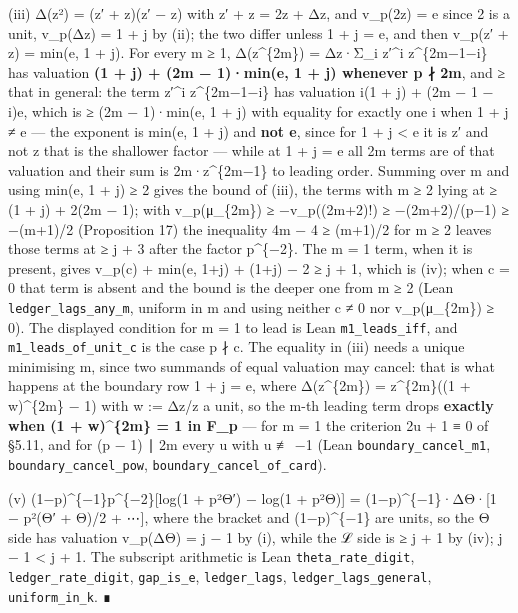 \documentclass[11pt,a4paper]{article}
\theoremstyle{named}
\begin{document}
(iii) Δ(z²) = (z′ + z)(z′ − z) with z′ + z = 2z + Δz, and v\_p(2z) = e since 2 is a unit, v\_p(Δz) = 1 + j by (ii); the two differ unless 1 + j = e, and then v\_p(z′ + z) = min(e, 1 + j). For every m ≥ 1, Δ(z\textasciicircum{}\{2m\}) = Δz·Σ\_i z′\textasciicircum{}i z\textasciicircum{}\{2m−1−i\} has valuation \textbf{(1 + j) + (2m − 1)·min(e, 1 + j) whenever p ∤ 2m}, and ≥ that in general: the term z′\textasciicircum{}i z\textasciicircum{}\{2m−1−i\} has valuation i(1 + j) + (2m − 1 − i)e, which is ≥ (2m − 1)·min(e, 1 + j) with equality for exactly one i when 1 + j ≠ e — the exponent is min(e, 1 + j) and \textbf{not e}, since for 1 + j \textless{} e it is z′ and not z that is the shallower factor — while at 1 + j = e all 2m terms are of that valuation and their sum is 2m·z\textasciicircum{}\{2m−1\} to leading order. Summing over m and using min(e, 1 + j) ≥ 2 gives the bound of (iii), the terms with m ≥ 2 lying at ≥ (1 + j) + 2(2m − 1); with v\_p(μ\_\{2m\}) ≥ −v\_p((2m+2)!) ≥ −(2m+2)/(p−1) ≥ −(m+1)/2 (Proposition 17) the inequality 4m − 4 ≥ (m+1)/2 for m ≥ 2 leaves those terms at ≥ j + 3 after the factor p\textasciicircum{}\{−2\}. The m = 1 term, when it is present, gives v\_p(c) + min(e, 1+j) + (1+j) − 2 ≥ j + 1, which is (iv); when c = 0 that term is absent and the bound is the deeper one from m ≥ 2 (Lean \texttt{ledger\_\allowbreak{}lags\_\allowbreak{}any\_\allowbreak{}m}, uniform in m and using neither c ≠ 0 nor v\_p(μ\_\{2m\}) ≥ 0). The displayed condition for m = 1 to lead is Lean \texttt{m1\_\allowbreak{}leads\_\allowbreak{}iff}, and \texttt{m1\_\allowbreak{}leads\_\allowbreak{}of\_\allowbreak{}unit\_\allowbreak{}c} is the case p ∤ c. The equality in (iii) needs a unique minimising m, since two summands of equal valuation may cancel: that is what happens at the boundary row 1 + j = e, where Δ(z\textasciicircum{}\{2m\}) = z\textasciicircum{}\{2m\}((1 + w)\textasciicircum{}\{2m\} − 1) with w := Δz/z a unit, so the m-th leading term drops \textbf{exactly when (1 + w)\textasciicircum{}\{2m\} = 1 in F\_p} — for m = 1 the criterion 2u + 1 ≡ 0 of §5.11, and for (p − 1) ∣ 2m every u with u ≢ −1 (Lean \texttt{boundary\_\allowbreak{}cancel\_\allowbreak{}m1}, \texttt{boundary\_\allowbreak{}cancel\_\allowbreak{}pow}, \texttt{boundary\_\allowbreak{}cancel\_\allowbreak{}of\_\allowbreak{}card}).

(v) (1−p)\textasciicircum{}\{−1\}p\textasciicircum{}\{−2\}[log(1 + p²Θ′) − log(1 + p²Θ)] = (1−p)\textasciicircum{}\{−1\}·ΔΘ·[1 − p²(Θ′ + Θ)/2 + ⋯], where the bracket and (1−p)\textasciicircum{}\{−1\} are units, so the Θ side has valuation v\_p(ΔΘ) = j − 1 by (i), while the ℒ side is ≥ j + 1 by (iv); j − 1 \textless{} j + 1. The subscript arithmetic is Lean \texttt{theta\_\allowbreak{}rate\_\allowbreak{}digit}, \texttt{ledger\_\allowbreak{}rate\_\allowbreak{}digit}, \texttt{gap\_\allowbreak{}is\_\allowbreak{}e}, \texttt{ledger\_\allowbreak{}lags}, \texttt{ledger\_\allowbreak{}lags\_\allowbreak{}general}, \texttt{uniform\_\allowbreak{}in\_\allowbreak{}k}. ∎
\end{document}
